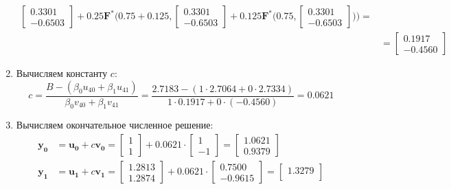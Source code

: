 \documentclass[a4paper, 12pt]{article}
\begin{document}
\begin{enumerate}
\begin{align*}
				\begin{bmatrix}
					0.3301\\
					-0.6503
				\end{bmatrix} + 0.25\mathbf{F^*}\bigg(0.75 + 0.125, 
				\begin{bmatrix}
					0.3301\\
					-0.6503
				\end{bmatrix} + 0.125\mathbf{F^*}\bigg(0.75, 
				\begin{bmatrix}
					0.3301\\
					-0.6503
				\end{bmatrix}\bigg)\bigg)=\\&=
				\begin{bmatrix}
					0.1917\\
					-0.4560
				\end{bmatrix}
			\end{align*}
		\item Вычисляем константу $c$:
			\begin{equation*}
				c=\dfrac{B-(\beta_0u_{40}+\beta_1u_{41})}{\beta_0v_{40}+\beta_1v_{41}}=
				\dfrac{2.7183-(1\cdot2.7064+0\cdot2.7334)}{1\cdot0.1917+0\cdot(-0.4560)}=0.0621
			\end{equation*}
		\item Вычисляем окончательное численное решение:
			\begin{align*}
				\mathbf{y_0}&=\mathbf{u_0}+c\mathbf{v_0}=
				\begin{bmatrix}
					1\\
					1
				\end{bmatrix} + 0.0621 \cdot 
				\begin{bmatrix}
					1\\
					-1
				\end{bmatrix} = 
				\begin{bmatrix}
					1.0621\\
					0.9379
				\end{bmatrix}\\
				\mathbf{y_1}&=\mathbf{u_1}+c\mathbf{v_1}=
				\begin{bmatrix}
					1.2813\\
					1.2874
				\end{bmatrix} + 0.0621 \cdot 
				\begin{bmatrix}
					0.7500\\
					-0.9615
				\end{bmatrix} = 
				\begin{bmatrix}
					1.3279\\

\end{bmatrix}
\end{align*}
\end{enumerate}
\end{document}
